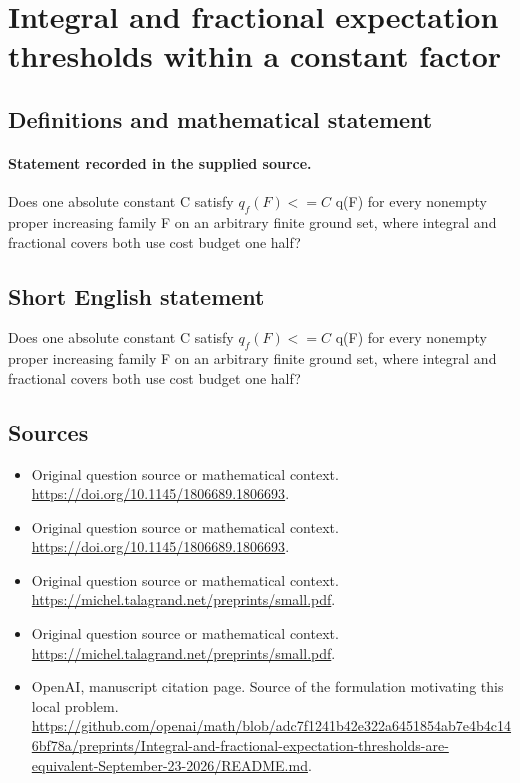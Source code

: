 \documentclass[11pt]{article}
\begin{document}
\section*{Integral and fractional expectation thresholds within a constant factor}\label{30007095}
\subsection{Definitions and mathematical statement}
\paragraph{Statement recorded in the supplied source.}
Does one absolute constant C satisfy $q_f(F)<=C$ q(F) for every nonempty proper increasing family F on an arbitrary finite ground set, where integral and fractional covers both use cost budget one half?
\subsection{Short English statement}
Does one absolute constant C satisfy $q_f(F)<=C$ q(F) for every nonempty proper increasing family F on an arbitrary finite ground set, where integral and fractional covers both use cost budget one half?
\subsection{Sources}
\begin{itemize}
\item[S1] Original question source or mathematical context.
\url{https://doi.org/10.1145/1806689.1806693}.
\item[S2] Original question source or mathematical context.
\url{https://doi.org/10.1145/1806689.1806693}.
\item[S3] Original question source or mathematical context.
\url{https://michel.talagrand.net/preprints/small.pdf}.
\item[S4] Original question source or mathematical context.
\url{https://michel.talagrand.net/preprints/small.pdf}.
\item[S5] OpenAI, manuscript citation page. Source of the formulation motivating this local problem.
\url{https://github.com/openai/math/blob/adc7f1241b42e322a6451854ab7e4b4c146bf78a/preprints/Integral-and-fractional-expectation-thresholds-are-equivalent-September-23-2026/README.md}.
\end{itemize}
\end{document}
